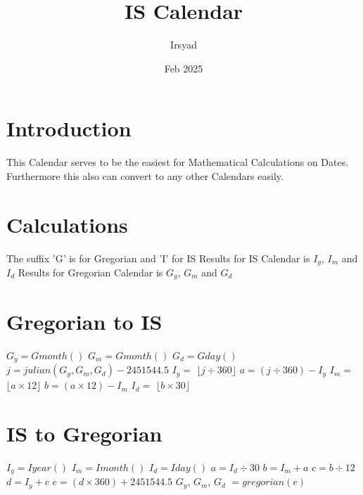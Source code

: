 \documentclass[11pt, letterpaper]{article}
\begin{document}
\title{IS Calendar}
\author{Irsyad}
\date{Feb 2025}

\maketitle

\section{Introduction}
This Calendar serves to be the easiest for Mathematical Calculations on Dates. Furthermore this also can convert to any other Calendars easily.

\section{Calculations}

The suffix 'G' is for Gregorian and 'I' for IS \newline
Results for IS Calendar is $I_y$, $I_m$ and $I_d$ \newline
Results for Gregorian Calendar is $G_y$, $G_m$ and $G_d$ \newline

\section*{Gregorian to IS}

$G_y = Gmonth()$ \newline
$G_m = Gmonth()$ \newline
$G_d = Gday()$ \newline
$j = julian(G_y, G_m, G_d) - 2451544.5$ \newline
$I_y =$ $\lfloor j \div 360 \rfloor$ \newline
$a = (j \div 360) - I_y$ \newline
$I_m =$ $\lfloor a \times 12 \rfloor$ \newline
$b = (a \times 12) - I_m$ \newline
$I_d =$ $\lfloor b \times 30 \rfloor$ \newline

\section*{IS to Gregorian}

$I_y = Iyear()$ \newline
$I_m = Imonth()$ \newline
$I_d = Iday()$ \newline
$a = I_d \div 30$ \newline
$b = I_m + a$ \newline
$c = b \div 12$ \newline
$d = I_y + c$ \newline
$e = (d \times 360) + 2451544.5$ \newline
$G_y$, $G_m$, $G_d$ $=gregorian(e)$ \newline
\end{document}
